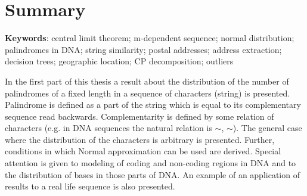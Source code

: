 \chapter*{Summary}

\begin{center}
	\textbf{Keywords}: 
	central limit theorem;
	m-dependent sequence;
	normal distribution;
	palindromes in DNA;
	string similarity;
	postal addresses;
	address	extraction;
	decision trees;
	geographic location;
	CP decomposition;
	outliers
\end{center}

\vspace{3ex}

In the first part of this thesis a result about the distribution of the number 
of palindromes of a fixed length in a sequence of characters (string) is presented. 
Palindrome is defined as a part of the string which is equal to its complementary
sequence read backwards. Complementarity is defined by some relation of characters
(e.g. in DNA sequences the natural relation is 
$\sim$, $\sim$). 
The general case where the distribution of the characters is arbitrary is presented. 
Further, conditions in which Normal approximation can be used are derived.
Special attention is given to modeling of coding and non-coding
regions in DNA and to the distribution of bases in those parts of DNA.
An example of an application of results to a real life sequence is also presented.

